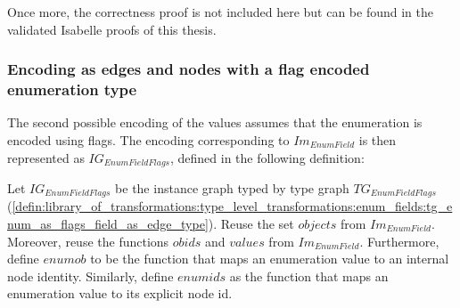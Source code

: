 Once more, the correctness proof is not included here but can be found in the validated Isabelle proofs of this thesis.

\subsubsection{Encoding as edges and nodes with a flag encoded enumeration type}

The second possible encoding of the values assumes that the enumeration is encoded using flags. The encoding corresponding to $Im_{EnumField}$ is then represented as $IG_{EnumFieldFlags}$, defined in the following definition:

\begin{defin}
\label{defin:library_of_transformations:instance_level_transformations:enum_field_values:ig_enum_as_flags_field_as_edge_type}
Let $IG_{EnumFieldFlags}$ be the instance graph typed by type graph $TG_{EnumFieldFlags}$ (\cref{defin:library_of_transformations:type_level_transformations:enum_fields:tg_enum_as_flags_field_as_edge_type}). Reuse the set $objects$ from $Im_{EnumField}$. Moreover, reuse the functions $obids$ and $values$ from $Im_{EnumField}$. Furthermore, define $enumob$ to be the function that maps an enumeration value to an internal node identity. Similarly, define $enumids$ as the function that maps an enumeration value to its explicit node id.


\end{defin}
